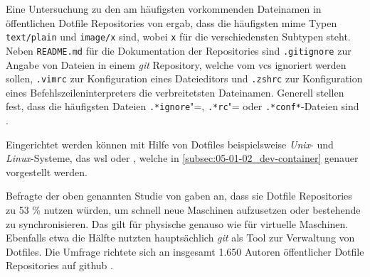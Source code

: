 Eine Untersuchung zu den am häufigsten vorkommenden Dateinamen in öffentlichen Dotfile Repositories von \citeauthor{029:Connecting-the-Dotfiles} ergab, dass die häufigsten \Gls{mime} Typen \texttt{text/plain} und \texttt{image/x} sind, wobei \texttt{x} für die verschiedensten Subtypen steht. Neben \texttt{README.md} für die Dokumentation der Repositories sind \texttt{.gitignore} zur Angabe von Dateien in einem \textit{\Gls{git}} Repository, welche vom \Gls{vcs} ignoriert werden sollen, \texttt{.vimrc} zur Konfiguration eines Dateieditors und \texttt{.zshrc} zur Konfiguration eines Befehlszeileninterpreters die verbreitetsten Dateinamen. Generell stellen \citeauthor{029:Connecting-the-Dotfiles} fest, dass die häufigsten Dateien \texttt{.*ignore}"=, \texttt{.*rc}"= oder \texttt{.*conf*}-Dateien sind \cite{029:Connecting-the-Dotfiles}.

Eingerichtet werden können mit Hilfe von Dotfiles beispielsweise \textit{Unix}- und \textit{Linux}-Systeme, das \Gls{wsl} oder  \cite{203:Dev-Environment-as-a-Code-with-DevContainers-Dotfiles-and-GitHub-Codespaces}, welche in \autoref{subsec:05-01-02_dev-container} genauer vorgestellt werden.

Befragte der oben genannten Studie von \citeauthor{029:Connecting-the-Dotfiles} gaben an, dass sie Dotfile Repositories zu 53 \% nutzen würden, um schnell neue Maschinen aufzusetzen oder bestehende zu synchronisieren. Das gilt für physische genauso wie für virtuelle Maschinen. Ebenfalls etwa die Hälfte nutzten hauptsächlich \textit{\Gls{git}} als Tool zur Verwaltung von Dotfiles. Die Umfrage richtete sich an insgesamt 1.650 Autoren öffentlicher Dotfile Repositories auf \Gls{github} \cite{029:Connecting-the-Dotfiles}.
